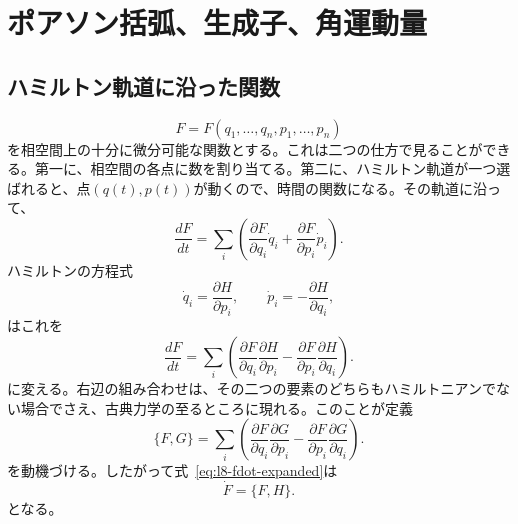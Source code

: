 \chapter{ポアソン括弧、生成子、角運動量}


\section{ハミルトン軌道に沿った関数}

\[
  F=F(q_1,\ldots,q_n,p_1,\ldots,p_n)
\]を相空間上の十分に微分可能な関数とする。これは二つの仕方で見ることができる。第一に、相空間の各点に数を割り当てる。第二に、ハミルトン軌道が一つ選ばれると、点\((q(t),p(t))\)が動くので、時間の関数になる。その軌道に沿って、\begin{equation}
  \frac{dF}{dt}
  =
  \sum_i\left(
    \frac{\partial F}{\partial q_i}\dot q_i
    +\frac{\partial F}{\partial p_i}\dot p_i
  \right).
  \label{eq:l8-chain-rule}
\end{equation}ハミルトンの方程式\begin{equation}
  \dot q_i=\frac{\partial H}{\partial p_i},
  \qquad
  \dot p_i=-\frac{\partial H}{\partial q_i},
  \label{eq:l8-hamilton-equations}
\end{equation}はこれを\begin{equation}
  \frac{dF}{dt}
  =
  \sum_i\left(
    \frac{\partial F}{\partial q_i}
    \frac{\partial H}{\partial p_i}
    -
    \frac{\partial F}{\partial p_i}
    \frac{\partial H}{\partial q_i}
  \right).
  \label{eq:l8-fdot-expanded}
\end{equation}に変える。右辺の組み合わせは、その二つの要素のどちらもハミルトニアンでない場合でさえ、古典力学の至るところに現れる。このことが定義\begin{equation}
  \boxed{
  \{F,G\}
  =
  \sum_i\left(
    \frac{\partial F}{\partial q_i}
    \frac{\partial G}{\partial p_i}
    -
    \frac{\partial F}{\partial p_i}
    \frac{\partial G}{\partial q_i}
  \right).}
  \label{eq:l8-poisson-definition}
\end{equation}を動機づける。したがって式~\eqref{eq:l8-fdot-expanded}は\begin{equation}
  \boxed{\dot F=\{F,H\}.}
  \label{eq:l8-time-generator}
\end{equation}となる。

